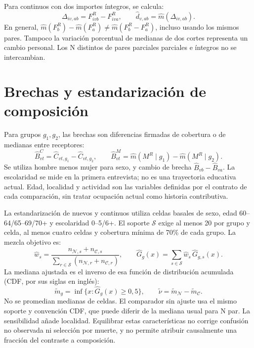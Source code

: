 Para continuos con dos importes íntegros, se calcula:
\begin{equation}
 \Delta_{iv,ab}=F^R_{ivb}-F^R_{iva},\qquad
 \widehat d_{v,ab}=\widehat m(\Delta_{iv,ab}).
 \label{eq:cambio-personal}
\end{equation}
En general,
$\widehat m(F^R_b)-\widehat m(F^R_a)\ne
\widehat m(F^R_b-F^R_a)$, incluso usando los mismos pares. Tampoco la
variación porcentual de medianas de dos cortes representa un cambio personal.
Los N distintos de pares parciales parciales e íntegros no se intercambian.

\section{Brechas y estandarización de composición}
\label{sec:composicion-comun}

Para grupos $g_1,g_2$, las brechas son diferencias firmadas de cobertura
o de medianas entre receptores:
\begin{equation}
 \widehat B^C_{vt}=\widehat C_{vt,g_1}-\widehat C_{vt,g_2},\qquad
 \widehat B^M_{vt}=\widehat m(M^R\mid g_1)-\widehat m(M^R\mid g_2).
 \label{eq:brechas}
\end{equation}
Se utiliza hombre menos mujer para sexo, y cambio de brecha
$\widehat B_{vb}-\widehat B_{va}$. La escolaridad se mide en la primera
entrevista; no es una trayectoria educativa actual. Edad, localidad y actividad
son las variables definidas por el contrato de cada comparación, sin tratar
ocupación actual como historia contributiva.

La estandarización de nuevos y continuos utiliza celdas basales de sexo,
edad 60--64/65--69/70+ y escolaridad 0--5/6+.
El soporte $\mathcal S$ exige al menos 20 por grupo y celda, al menos cuatro
celdas y cobertura mínima de 70\% de cada grupo. La mezcla objetivo es:
\begin{equation}
 \widehat w_s=
 \frac{n_{\mathcal N,s}+n_{\mathcal C,s}}
 {\sum_{r\in\mathcal S}(n_{\mathcal N,r}+n_{\mathcal C,r})},\qquad
 \widehat G_g(x)=\sum_{s\in\mathcal S}\widehat w_s\,\widehat G_{g,s}(x).
 \label{eq:cdf-estandarizada}
\end{equation}
La mediana ajustada es el inverso de esa función de distribución acumulada
(CDF, por sus siglas en inglés):
\begin{equation}
 \widetilde m_g=\inf\{x:\widehat G_g(x)\geq0{,}5\},\qquad
 \widetilde\nu=\widetilde m_{\mathcal N}-\widetilde m_{\mathcal C}.
 \label{eq:mediana-estandarizada}
\end{equation}
No se promedian medianas de celdas. El comparador sin ajuste usa el mismo
soporte y convención CDF, que puede diferir de la mediana usual para N par.
La sensibilidad añade localidad. Equilibrar estas características no corrige
confusión no observada ni selección por muerte, y no permite atribuir causalmente
una fracción del contraste a composición.

